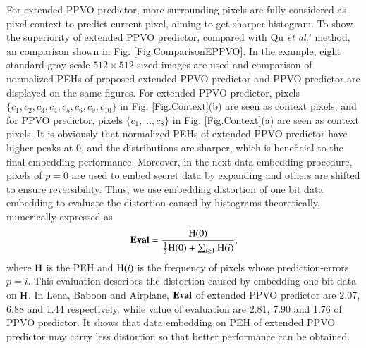 \documentclass[review,3p,10pt,sort&compress]{elsarticle}
\begin{document}
For extended PPVO predictor, more surrounding pixels are fully considered as pixel context to predict current pixel, aiming to get sharper histogram. To show the superiority of extended PPVO predictor, compared with Qu \emph{et al.}' method, an comparison shown in Fig. \ref{Fig.ComparisonEPPVO}. In the example, eight standard gray-scale $512 \times 512$ sized images  are used and comparison of normalized PEHs of proposed extended PPVO predictor and PPVO predictor are displayed on the same figures. 
For extended PPVO predictor, pixels $\{c_{1}, c_{2}, c_{3}, c_{4}, c_{5}, c_{6}, c_{9}, c_{10}\}$ in Fig. \ref{Fig.Context}(b) are seen as context pixels, and for PPVO predictor, pixels $\{c_{1}, ..., c_{8}\}$ in Fig. \ref{Fig.Context}(a) are seen as context pixels. It is obviously that normalized PEHs of extended PPVO predictor have higher peaks at $0$, and the distributions are sharper, which is beneficial to the final embedding performance. Moreover, in the next data embedding procedure, pixels of $p = 0$ are used to embed secret data by expanding and others are shifted to ensure reversibility. Thus, we use embedding distortion of one bit data embedding to evaluate the distortion caused by histograms theoretically, numerically expressed as
\begin{equation*}\label{eq:EvaluateHistogram}
{\rm \mathbf{Eval}} = \frac{{\rm H}(0)}{\frac{1}{2}{\rm H}(0)+ \sum_{i \geq 1}{\rm H}(i)},
\end{equation*}
where ${\rm H}$ is the PEH and ${\rm H}(i)$ is the frequency of pixels whose prediction-errors $p = i$. This evaluation describes the distortion caused by embedding one bit data on ${\rm H}$. In Lena, Baboon and Airplane, ${\rm \mathbf{Eval}}$ of extended PPVO predictor are 2.07, 6.88 and 1.44 respectively, while value of evaluation are 2.81, 7.90 and 1.76 of PPVO predictor. It shows that data embedding on PEH of extended PPVO predictor may carry less distortion so that better performance can be obtained.
\end{document}
